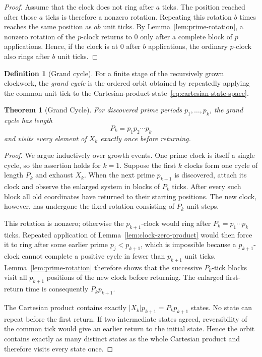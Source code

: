 \documentclass[11pt,a4paper]{article}
\theoremstyle{clockplain}
\newtheorem{theorem}[proposition]{Theorem}
\theoremstyle{definition}
\newtheorem{definition}[proposition]{Definition}
\theoremstyle{remark}
\begin{document}
\begin{proof}
Assume that the clock does not ring after $a$ ticks.  The position reached after those $a$ ticks is therefore a nonzero rotation.  Repeating this rotation $b$ times reaches the same position as $ab$ unit ticks.  By Lemma~\ref{lem:prime-rotation}, a nonzero rotation of the $p$-clock returns to $0$ only after a complete block of $p$ applications.  Hence, if the clock is at $0$ after $b$ applications, the ordinary $p$-clock also rings after $b$ unit ticks.
\end{proof}

\begin{definition}[Grand cycle]
For a finite stage of the recursively grown clockwork, the \emph{grand cycle} is the ordered orbit obtained by repeatedly applying the common unit tick to the Cartesian-product state~\eqref{eq:cartesian-state-space}.
\end{definition}

\begin{theorem}[Grand Cycle]
\label{prop:grand-cycle}
For discovered prime periods $p_1,\ldots,p_k$, the grand cycle has length
\begin{equation}
P_k=p_1p_2\cdots p_k
\label{eq:grand-cycle-length}
\end{equation}
and visits every element of $X_k$ exactly once before returning.
\end{theorem}

\begin{proof}
We argue inductively over growth events.  One prime clock is itself a single cycle, so the assertion holds for $k=1$.  Suppose the first $k$ clocks form one cycle of length $P_k$ and exhaust $X_k$.  When the next prime $p_{k+1}$ is discovered, attach its clock and observe the enlarged system in blocks of $P_k$ ticks.  After every such block all old coordinates have returned to their starting positions.  The new clock, however, has undergone the fixed rotation consisting of $P_k$ unit steps.

This rotation is nonzero; otherwise the $p_{k+1}$-clock would ring after $P_k=p_1\cdots p_k$ ticks.  Repeated application of Lemma~\ref{lem:clock-zero-product} would then force it to ring after some earlier prime $p_j<p_{k+1}$, which is impossible because a $p_{k+1}$-clock cannot complete a positive cycle in fewer than $p_{k+1}$ unit ticks.  Lemma~\ref{lem:prime-rotation} therefore shows that the successive $P_k$-tick blocks visit all $p_{k+1}$ positions of the new clock before returning.  The enlarged first-return time is consequently $P_kp_{k+1}$.

The Cartesian product contains exactly $|X_k|p_{k+1}=P_kp_{k+1}$ states.  No state can repeat before the first return.  If two intermediate states agreed, reversibility of the common tick would give an earlier return to the initial state.  Hence the orbit contains exactly as many distinct states as the whole Cartesian product and therefore visits every state once.
\end{proof}
\end{document}

